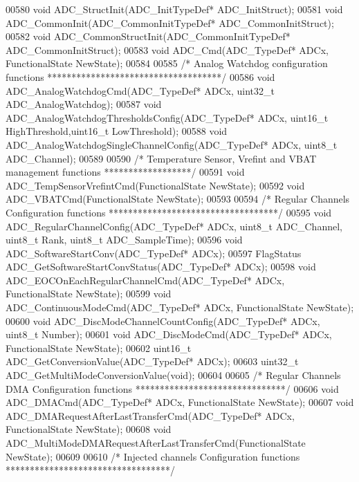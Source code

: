 \begin{DoxyCode}
00580 \textcolor{keywordtype}{void} ADC_StructInit(ADC\_InitTypeDef* ADC\_InitStruct);
00581 \textcolor{keywordtype}{void} ADC_CommonInit(ADC\_CommonInitTypeDef* ADC\_CommonInitStruct);
00582 \textcolor{keywordtype}{void} ADC_CommonStructInit(ADC\_CommonInitTypeDef* ADC\_CommonInitStruct);
00583 \textcolor{keywordtype}{void} ADC_Cmd(ADC\_TypeDef* ADCx, FunctionalState NewState);
00584 
00585 \textcolor{comment}{/* Analog Watchdog configuration functions ************************************/}
00586 \textcolor{keywordtype}{void} ADC_AnalogWatchdogCmd(ADC\_TypeDef* ADCx, uint32\_t ADC\_AnalogWatchdog);
00587 \textcolor{keywordtype}{void} ADC_AnalogWatchdogThresholdsConfig(ADC\_TypeDef* ADCx, uint16\_t HighThreshold,uint16\_t 
      LowThreshold);
00588 \textcolor{keywordtype}{void} ADC_AnalogWatchdogSingleChannelConfig(ADC\_TypeDef* ADCx, uint8\_t ADC\_Channel);
00589 
00590 \textcolor{comment}{/* Temperature Sensor, Vrefint and VBAT management functions ******************/}
00591 \textcolor{keywordtype}{void} ADC_TempSensorVrefintCmd(FunctionalState NewState);
00592 \textcolor{keywordtype}{void} ADC_VBATCmd(FunctionalState NewState);
00593 
00594 \textcolor{comment}{/* Regular Channels Configuration functions ***********************************/}
00595 \textcolor{keywordtype}{void} ADC_RegularChannelConfig(ADC\_TypeDef* ADCx, uint8\_t ADC\_Channel, uint8\_t Rank, uint8\_t 
      ADC\_SampleTime);
00596 \textcolor{keywordtype}{void} ADC_SoftwareStartConv(ADC\_TypeDef* ADCx);
00597 FlagStatus ADC_GetSoftwareStartConvStatus(ADC\_TypeDef* ADCx);
00598 \textcolor{keywordtype}{void} ADC_EOCOnEachRegularChannelCmd(ADC\_TypeDef* ADCx, FunctionalState NewState);
00599 \textcolor{keywordtype}{void} ADC_ContinuousModeCmd(ADC\_TypeDef* ADCx, FunctionalState NewState);
00600 \textcolor{keywordtype}{void} ADC_DiscModeChannelCountConfig(ADC\_TypeDef* ADCx, uint8\_t Number);
00601 \textcolor{keywordtype}{void} ADC_DiscModeCmd(ADC\_TypeDef* ADCx, FunctionalState NewState);
00602 uint16\_t ADC_GetConversionValue(ADC\_TypeDef* ADCx);
00603 uint32\_t ADC_GetMultiModeConversionValue(\textcolor{keywordtype}{void});
00604 
00605 \textcolor{comment}{/* Regular Channels DMA Configuration functions *******************************/}
00606 \textcolor{keywordtype}{void} ADC_DMACmd(ADC\_TypeDef* ADCx, FunctionalState NewState);
00607 \textcolor{keywordtype}{void} ADC_DMARequestAfterLastTransferCmd(ADC\_TypeDef* ADCx, FunctionalState NewState);
00608 \textcolor{keywordtype}{void} ADC_MultiModeDMARequestAfterLastTransferCmd(FunctionalState NewState);
00609 
00610 \textcolor{comment}{/* Injected channels Configuration functions **********************************/}

\end{DoxyCode}
